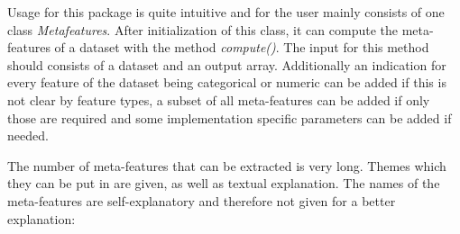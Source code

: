 \documentclass[10pt,a4paper]{article}
\begin{document}
	Usage for this package is quite intuitive and for the user mainly consists of one class \textit{Metafeatures}. After initialization of this class, it can compute the meta-features of a dataset with the method \textit{compute()}. The input for this method should consists of a dataset and an output array. Additionally an indication for every feature of the dataset being categorical or numeric can be added if this is not clear by feature types, a subset of all meta-features can be added if only those are required and some implementation specific parameters can be added if needed.
	
	The number of meta-features that can be extracted is very long. Themes which they can be put in are given, as well as textual explanation. The names of the meta-features are self-explanatory and therefore not given for a better explanation:
	
\end{document}
